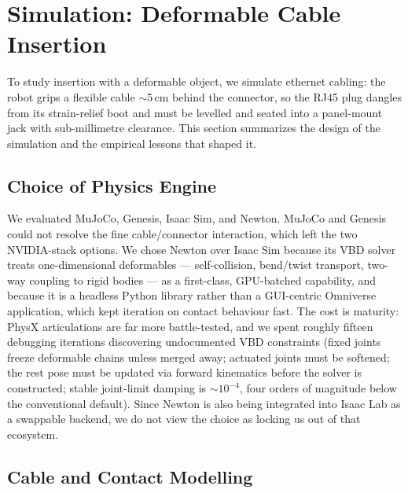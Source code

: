 

\section{Simulation: Deformable Cable Insertion}

To study insertion with a deformable object, we simulate ethernet
cabling: the robot grips a flexible cable $\sim$5\,cm behind the
connector, so the RJ45 plug dangles from its strain-relief boot and
must be levelled and seated into a panel-mount jack with
sub-millimetre clearance. This section summarizes the design of the
simulation and the empirical lessons that shaped it.

\subsection{Choice of Physics Engine}

We evaluated MuJoCo, Genesis, Isaac Sim, and Newton. MuJoCo and
Genesis could not resolve the fine cable/connector interaction, which
left the two NVIDIA-stack options. We chose Newton over Isaac Sim
because its VBD solver treats one-dimensional deformables ---
self-collision, bend/twist transport, two-way coupling to rigid
bodies --- as a first-class, GPU-batched capability, and because it
is a headless Python library rather than a GUI-centric Omniverse
application, which kept iteration on contact behaviour fast. The cost
is maturity: PhysX articulations are far more battle-tested, and we
spent roughly fifteen debugging iterations discovering undocumented
VBD constraints (fixed joints freeze deformable chains unless
merged away; actuated joints must be softened; the rest pose must be
updated via forward kinematics before the solver is constructed;
stable joint-limit damping is $\sim 10^{-4}$, four orders of
magnitude below the conventional default).
Since Newton is also being integrated into Isaac Lab as a swappable
backend, we do not view the choice as locking us out of that
ecosystem.

\subsection{Cable and Contact Modelling}

